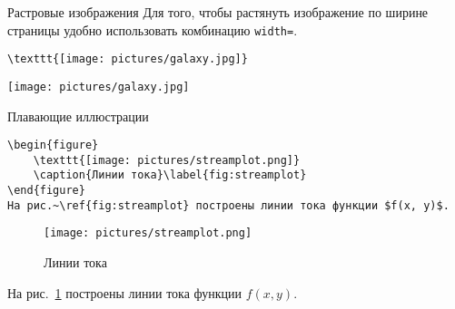 \begin{frame}[fragile]{Растровые изображения}
	\small
	Для того, чтобы растянуть изображение по ширине страницы удобно использовать комбинацию \texttt{width=\textwidth}. 

	\begin{verbatim}
\texttt{[image: pictures/galaxy.jpg]}
	\end{verbatim}

	\texttt{[image: pictures/galaxy.jpg]}

	
\end{frame}

\begin{frame}[fragile]{Плавающие иллюстрации}
	\small
\begin{verbatim}
\begin{figure}
	\texttt{[image: pictures/streamplot.png]}
	\caption{Линии тока}\label{fig:streamplot}
\end{figure}
На рис.~\ref{fig:streamplot} построены линии тока функции $f(x, y)$.
\end{verbatim}
	
	\begin{figure}
		\texttt{[image: pictures/streamplot.png]}
		\caption{Линии тока}\label{fig:streamplot}
	\end{figure}
	На рис.~\ref{fig:streamplot} построены линии тока функции $f(x, y)$.
\end{frame}

